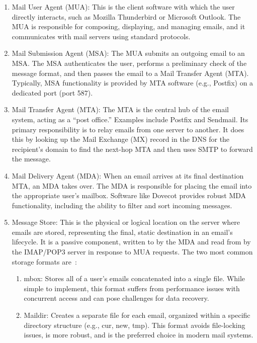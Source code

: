\begin{enumerate}
    \item Mail User Agent (MUA): This is the client software with which the user directly interacts, such as Mozilla Thunderbird or Microsoft Outlook. The MUA is responsible for composing, displaying, and managing emails, and it communicates with mail servers using standard protocols.
    \item Mail Submission Agent (MSA): The MUA submits an outgoing email to an MSA. The MSA authenticates the user, performs a preliminary check of the message format, and then passes the email to a Mail Transfer Agent (MTA). Typically, MSA functionality is provided by MTA software (e.g., Postfix) on a dedicated port (port 587).
    \item Mail Transfer Agent (MTA): The MTA is the central hub of the email system, acting as a ``post office.'' Examples include Postfix and Sendmail. Its primary responsibility is to relay emails from one server to another. It does this by looking up the Mail Exchange (MX) record in the DNS for the recipient's domain to find the next-hop MTA and then uses SMTP to forward the message.
    \item Mail Delivery Agent (MDA): When an email arrives at its final destination MTA, an MDA takes over. The MDA is responsible for placing the email into the appropriate user's mailbox. Software like Dovecot provides robust MDA functionality, including the ability to filter and sort incoming messages.
    \item Message Store: This is the physical or logical location on the server where emails are stored, representing the final, static destination in an email's lifecycle. It is a passive component, written to by the MDA and read from by the IMAP/POP3 server in response to MUA requests. The two most common storage formats are~\cite{MaildirSpec}:
    \begin{enumerate}
        \item mbox: Stores all of a user's emails concatenated into a single file. While simple to implement, this format suffers from performance issues with concurrent access and can pose challenges for data recovery.
        \item Maildir: Creates a separate file for each email, organized within a specific directory structure (e.g., cur, new, tmp). This format avoids file-locking issues, is more robust, and is the preferred choice in modern mail systems.
    \end{enumerate}
\end{enumerate}

